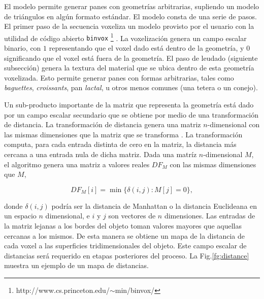 El modelo permite generar panes con geometrías arbitrarias, supliendo un modelo de triángulos en algún formato estándar.
El modelo consta de una serie de pasos. El primer paso de la secuencia voxeliza un modelo provisto por el usuario con la utilidad de código abierto {\tt binvox} \footnote{http://www.cs.princeton.edu/$\sim$min/binvox/} \cite{Nooruddin2003}.
La voxelización genera un campo escalar binario, con $1$ representando que el voxel dado está dentro de la geometría, y $0$ significando que el voxel está fuera de la geometría.
El paso de leudado (siguiente subsección) genera la textura del material que se ubica dentro de esta geometría voxelizada.
Esto permite generar panes con formas arbitrarias, tales como {\em baguettes}, {\em croissants}, pan {\em lactal}, u otros menos comunes (una tetera o un conejo).

Un sub-producto importante de la matriz que representa la geometría está dado por un campo escalar secundario que se obtiene por medio de una transformación de distancia.
La transformación de distancia genera una matriz $n$-dimensional con las mismas dimensiones que la matriz que se transforma \cite{osh03}.
La transformación computa, para cada entrada distinta de cero en la matriz, la distancia más cercana a una entrada nula de dicha matriz.
Dada una matríz $n$-dimensional $M$, el algoritmo genera una matriz a valores reales $DF_{M}$ con las mismas dimensiones que $M$,


$$  DF_{M}[i] = \min \bigg\{ \delta(i,j): M[j] = 0 \bigg\},$$


\noindent
donde $\delta(i,j)$ podría ser la distancia de Manhattan o la distancia Euclideana en un espacio $n$ dimensional, e $i$ y $j$ son vectores de $n$ dimensiones.
Las entradas de la matriz lejanas a los bordes del objeto toman valores mayores que aquellas cercanas a los mismos.
De esta manera se obtiene un mapa de la distancia de cada voxel a las superficies tridimensionales del objeto.
Este campo escalar de distancias será requerido en etapas posteriores del proceso.
La Fig.\ref{fg:distance} muestra un ejemplo de un mapa de distancias.

